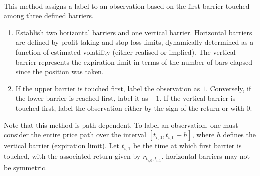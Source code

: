 \begin{method} \\
This method assigns a label to an observation based on the first barrier touched among three defined barriers.
\begin{enumerate}[label=\roman*.]
\setlength{\itemsep}{0pt}
\item Establish two horizontal barriers and one vertical barrier. Horizontal barriers are defined by profit-taking and stop-loss limits, dynamically determined as a function of estimated volatility (either realised or implied). The vertical barrier represents the expiration limit in terms of the number of bars elapsed since the position was taken.
\item If the upper barrier is touched first, label the observation as $1$. Conversely, if the lower barrier is reached first, label it as $-1$. If the vertical barrier is touched first, label the observation either by the sign of the return or with $0$.
\end{enumerate}
Note that this method is path-dependent. To label an observation, one must consider the entire price path over the interval $[t_{i,0}, t_{i,0} + h]$, where $h$ defines the vertical barrier (expiration limit). Let $t_{i,1}$ be the time at which first barrier is touched, with the associated return given by $r_{t_{i,0}, t_{i,1}}$. horizontal barriers may not be symmetric.
\end{method}

